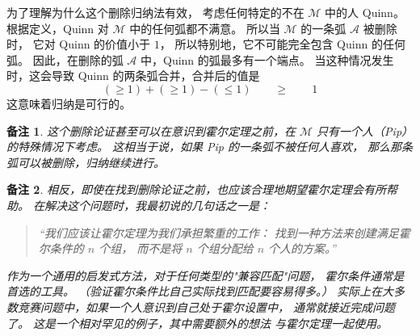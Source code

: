 \documentclass[11pt]{article}
\theoremstyle{claimstyle}
\theoremstyle{remarkstyle}
\newtheorem{remark}{备注}
\begin{document}
为了理解为什么这个删除归纳法有效，
考虑任何特定的不在 $\mathcal{M}$ 中的人 Quinn。
根据定义，Quinn 对 $\mathcal{M}$ 中的任何弧都不满意。
所以当 $\mathcal{M}$ 的一条弧 $\mathcal{A}$ 被删除时，
它对 Quinn 的价值小于 $1$，
所以特别地，它不可能完全包含 Quinn 的任何弧。
因此，在删除的弧 $\mathcal{A}$ 中，Quinn 的弧最多有一个端点。
当这种情况发生时，这会导致 Quinn 的两条弧合并，合并后的值是
\[ (\ge 1) + (\ge 1) - (\le 1) \qquad \ge \qquad 1 \]
这意味着归纳是可行的。

\begin{remark}
  这个删除论证甚至可以在意识到霍尔定理之前，在 $\mathcal{M}$ 只有一个人（Pip）的特殊情况下考虑。
  这相当于说，如果 Pip 的一条弧不被任何人喜欢，
  那么那条弧可以被删除，归纳继续进行。
\end{remark}

\begin{remark}
  相反，即使在找到删除论证之前，也应该合理地期望霍尔定理会有所帮助。
  在解决这个问题时，我最初说的几句话之一是：
  \begin{quote}
    ``我们应该让霍尔定理为我们承担繁重的工作：
    找到一种方法来创建满足霍尔条件的 $n$ 个组，
    而不是将 $n$ 个组分配给 $n$ 个人的方案。''
  \end{quote}
  作为一个通用的启发式方法，对于任何类型的"兼容匹配"问题，
  霍尔条件通常是首选的工具。
  （验证霍尔条件比自己实际找到匹配要容易得多。）
  实际上在大多数竞赛问题中，如果一个人意识到自己处于霍尔设置中，
  通常就接近完成问题了。
  这是一个相对罕见的例子，其中需要额外的想法
  与霍尔定理一起使用。
\end{remark}

\pagebreak
\end{document}
